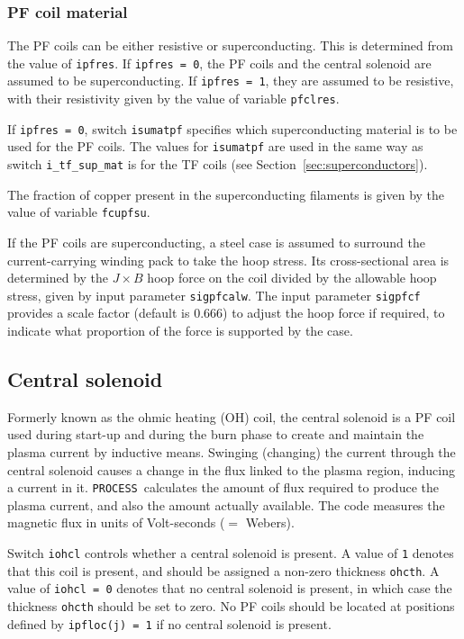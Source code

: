 \documentclass[11pt,a4paper]{report}
\newcommand{\process}{\mbox{\texttt{PROCESS}}}
\begin{document}
\subsubsection{PF coil material}

The PF coils can be either resistive or superconducting. This is determined
from the value of \texttt{ipfres}. If \texttt{ipfres = 0}, the PF coils and
the central solenoid are assumed to be superconducting. If \texttt{ipfres = 1},
they are assumed to be resistive, with their resistivity given by the value of
variable \texttt{pfclres}.

If \texttt{ipfres = 0}, switch \texttt{isumatpf} specifies which
superconducting material is to be used for the PF coils. The values for
\texttt{isumatpf} are used in the same way as switch \texttt{i\_tf\_sup\_mat} is for
the TF coils (see Section~\ref{sec:superconductors}).

The fraction of copper present in the superconducting filaments is given by
the value of variable \texttt{fcupfsu}.

If the PF coils are superconducting, a steel case is assumed to surround the
current-carrying winding pack to take the hoop stress. Its cross-sectional
area is determined by the $J \times B$ hoop force on the coil divided by the
allowable hoop stress, given by input parameter \texttt{sigpfcalw}. The input
parameter \texttt{sigpfcf} provides a scale factor (default is 0.666) to
adjust the hoop force if required, to indicate what proportion of the force is
supported by the case.

\subsection{Central solenoid}
\label{sec:ohcoil}

Formerly known as the ohmic heating (OH) coil, the central solenoid is a PF
coil used during start-up and during the burn phase to create
and maintain the plasma current by inductive means. Swinging (changing) the
current through the central solenoid causes a change in the flux linked to the
plasma region, inducing a current in it. \process\ calculates the amount of
flux required to produce the plasma current, and also the amount actually
available. The code measures the magnetic flux in units of Volt-seconds ($=$
Webers).

Switch \texttt{iohcl} controls whether a central solenoid is present. A value
of \texttt{1} denotes that this coil is present, and should be assigned a
non-zero thickness \texttt{ohcth}. A value of \texttt{iohcl = 0} denotes that
no central solenoid is present, in which case the thickness \texttt{ohcth}
should be set to zero. No PF coils should be located at positions defined by
\texttt{ipfloc(j) = 1} if no central solenoid is present.
\end{document}
